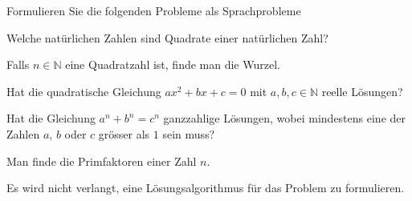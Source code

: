 Formulieren Sie die folgenden Probleme als Sprachprobleme
\begin{teilaufgaben}
\item Welche natürlichen Zahlen sind Quadrate einer natürlichen Zahl?
\item Falls $n\in\mathbb N$ eine Quadratzahl ist, finde man die Wurzel.
\item Hat die quadratische Gleichung $ax^2+bx+c=0$ mit $a,b,c\in\mathbb N$
reelle Lösungen?
\item Hat die Gleichung $a^n+b^n=c^n$ ganzzahlige Lösungen, wobei mindestens
eine der Zahlen $a$, $b$ oder $c$ grösser als $1$ sein muss?
\item Man finde die Primfaktoren einer Zahl $n$.
\end{teilaufgaben}


\begin{hinweis}
Es wird nicht verlangt, eine Lösungsalgorithmus für das Problem zu
formulieren.
\end{hinweis}


